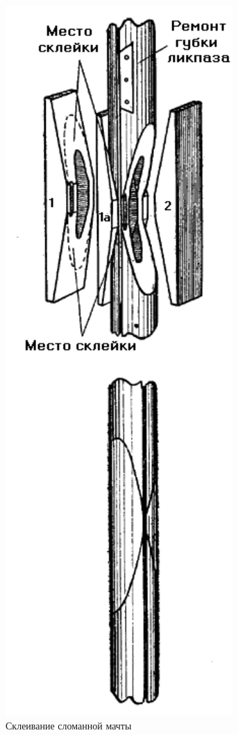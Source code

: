 \documentclass[a4paper, 12pt, twoside, final]{scrbook}
\begin{document}
\begin{figure}
   \centering
   \includegraphics{pics/74_Skleivanie_slom_machty} %
   \caption{Склеивание сломанной мачты}
   \label{fig:74}
\end{figure}
\end{document}
